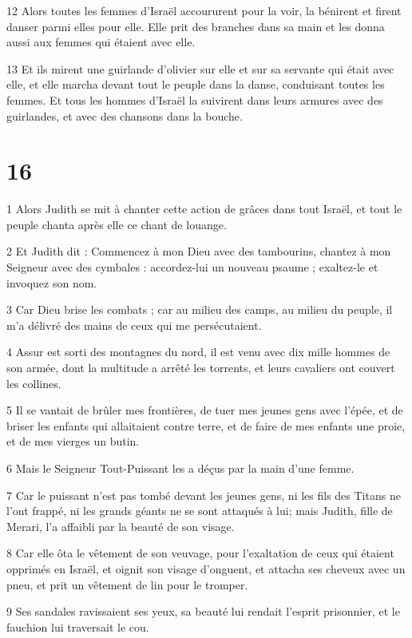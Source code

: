 \par 12 Alors toutes les femmes d'Israël accoururent pour la voir, la bénirent et firent danser parmi elles pour elle. Elle prit des branches dans sa main et les donna aussi aux femmes qui étaient avec elle.
\par 13 Et ils mirent une guirlande d'olivier sur elle et sur sa servante qui était avec elle, et elle marcha devant tout le peuple dans la danse, conduisant toutes les femmes. Et tous les hommes d'Israël la suivirent dans leurs armures avec des guirlandes, et avec des chansons dans la bouche.

\chapter{16}

\par 1 Alors Judith se mit à chanter cette action de grâces dans tout Israël, et tout le peuple chanta après elle ce chant de louange.
\par 2 Et Judith dit : Commencez à mon Dieu avec des tambourins, chantez à mon Seigneur avec des cymbales : accordez-lui un nouveau psaume ; exaltez-le et invoquez son nom.
\par 3 Car Dieu brise les combats ; car au milieu des camps, au milieu du peuple, il m'a délivré des mains de ceux qui me persécutaient.
\par 4 Assur est sorti des montagnes du nord, il est venu avec dix mille hommes de son armée, dont la multitude a arrêté les torrents, et leurs cavaliers ont couvert les collines.
\par 5 Il se vantait de brûler mes frontières, de tuer mes jeunes gens avec l'épée, et de briser les enfants qui allaitaient contre terre, et de faire de mes enfants une proie, et de mes vierges un butin.
\par 6 Mais le Seigneur Tout-Puissant les a déçus par la main d'une femme.
\par 7 Car le puissant n'est pas tombé devant les jeunes gens, ni les fils des Titans ne l'ont frappé, ni les grands géants ne se sont attaqués à lui; mais Judith, fille de Merari, l'a affaibli par la beauté de son visage.
\par 8 Car elle ôta le vêtement de son veuvage, pour l'exaltation de ceux qui étaient opprimés en Israël, et oignit son visage d'onguent, et attacha ses cheveux avec un pneu, et prit un vêtement de lin pour le tromper.
\par 9 Ses sandales ravissaient ses yeux, sa beauté lui rendait l'esprit prisonnier, et le fauchion lui traversait le cou.

